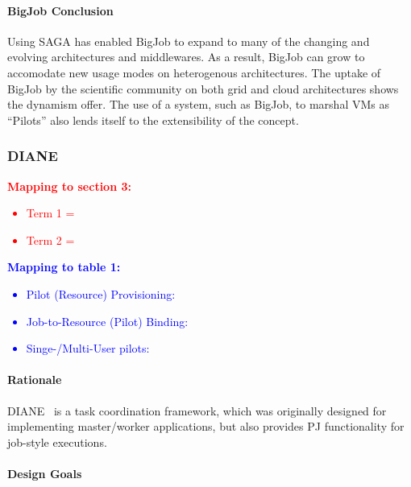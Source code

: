 \documentclass{sig-alternate}
\begin{document}
\paragraph{BigJob Conclusion}
Using SAGA has enabled BigJob to expand to many of the changing and evolving
architectures and middlewares. As a result, BigJob can grow to accomodate
new usage modes on heterogenous architectures. The uptake 
of BigJob by the scientific community
on both grid and cloud architectures shows the dynamism \pilotjobs offer.
The use of a \pilotjob system, such as BigJob, to marshal VMs as ``Pilots'' 
also lends itself to the extensibility of the \pilotjob concept.

\subsubsection{DIANE}

\textcolor{red}
{
\textbf{Mapping to section 3:}
\begin{itemize}
\item Term 1 =
\item Term 2 =
\end{itemize}
}

\textcolor{blue}
{
\textbf{Mapping to table 1:}
\begin{itemize}
\item Pilot (Resource) Provisioning:
\item Job-to-Resource (Pilot) Binding:
\item Singe-/Multi-User pilots:
\end{itemize}
}




\paragraph{Rationale}

DIANE~\cite{Moscicki:908910} is a task coordination framework, which
was originally designed for implementing master/worker applications,
but also provides PJ functionality for job-style executions.

\paragraph{Design Goals}
\end{document}

